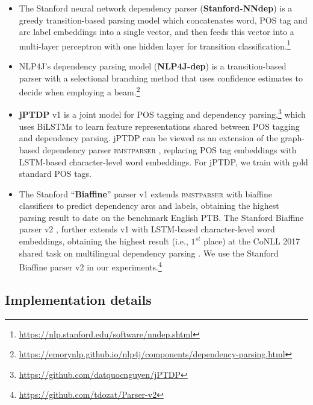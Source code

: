 \documentclass[twocolumn,hyperref]{bmcart}\pdfoutput=1
\begin{document}
\begin{itemize} 

\item  The Stanford neural network dependency parser  \cite{D14-1082}  (\textbf{Stanford-NNdep}) is a greedy  transition-based  parsing model   which concatenates word, POS tag and arc label embeddings into a single vector, and then feeds this vector into 
a multi-layer perceptron with one hidden layer for transition classification.\footnote{{\url{https://nlp.stanford.edu/software/nndep.shtml}}}

\item {NLP4J}'s dependency parsing model  \cite{choi-mccallum:2013:ACL2013} (\textbf{NLP4J-dep})    is  a transition-based parser with a selectional branching method  that uses confidence estimates to decide when employing a beam.\footnote{{\url{https://emorynlp.github.io/nlp4j/components/dependency-parsing.html}} }  


\item \textbf{jPTDP} v1   \cite{nguyen-dras-johnson-2017} is a  joint model for POS tagging and dependency parsing,\footnote{{\url{https://github.com/datquocnguyen/jPTDP}}} which uses BiLSTMs to learn feature representations shared between POS tagging and dependency parsing. jPTDP can be viewed as an extension of the  graph-based dependency parser \textsc{bmstparser} \cite{TACL885}, replacing POS tag embeddings with LSTM-based character-level word embeddings. For jPTDP, we train with gold standard POS tags.
 
\item The  Stanford ``\textbf{Biaffine}'' parser v1  \cite{DozatM16} extends \textsc{bmstparser} with biaffine classifiers to predict dependency arcs and labels, obtaining the highest parsing result to date on the benchmark English PTB.  
The Stanford Biaffine  parser v2 \cite{dozat-qi-manning:2017:K17-3}, further extends  v1 with  LSTM-based character-level word embeddings, obtaining the highest result (i.e., $1^{st}$ place) at the CoNLL 2017 shared task on multilingual dependency parsing \cite{zeman-EtAl:2017:K17-3}.   We use  the Stanford Biaffine  parser v2 in our experiments.\footnote{{\url{https://github.com/tdozat/Parser-v2}}}
 
\end{itemize}


\subsection*{Implementation details}
\end{document}
